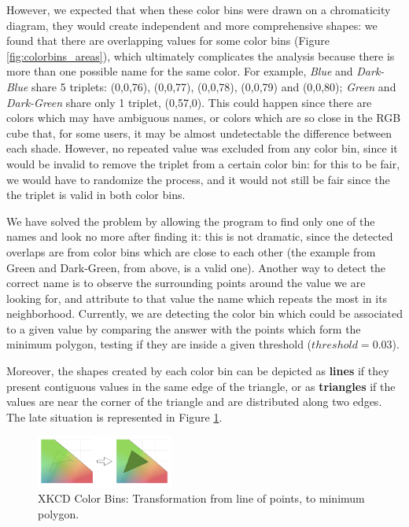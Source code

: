 %
However, we expected that when these color bins were drawn on a chromaticity diagram, they would create independent and more comprehensive shapes: we found that there are overlapping
values for some color bins (Figure \ref{fig:colorbins_areas}), which ultimately complicates the analysis because there is more than one possible name for the same color. For example, \emph{Blue} and \emph{Dark-Blue}
share 5 triplets: (0,0,76), (0,0,77), (0,0,78), (0,0,79) and (0,0,80); \emph{Green} and \emph{Dark-Green} share only 1 triplet, (0,57,0). This could happen since there are colors which may have ambiguous names, or
colors which are so close in the RGB cube that, for some users, it may be almost undetectable the difference between each shade. However, no repeated value was excluded from any color bin, since it would be invalid to
remove the triplet from a certain color bin: for this to be fair, we would have to randomize the process, and it would not still be fair since the the triplet is valid in both color bins. \par
%
We have solved the problem by allowing the program to find only one of the names and look no more after finding it: this is not dramatic, since the detected overlaps are from color bins which are close to each other
(the example from Green and Dark-Green, from above, is a valid one). Another way to detect the correct name is to observe the surrounding points around the value we are looking for, and attribute to that value the name
which repeats the most in its neighborhood. Currently, we are detecting the color bin which could be associated to a given value by comparing the answer with the points which form the
minimum polygon, testing if they are inside a given threshold ($threshold = 0.03$). \par
%
Moreover, the shapes created by each color bin can be depicted as \textbf{lines} if they present contiguous values in the same edge of the triangle, or as \textbf{triangles}
if the values are near the corner of the triangle and are distributed along two edges. The late situation is represented in Figure \ref{fig:colorbins_triangle}.
%
\begin{figure}
  \centering
  \includegraphics[width=0.4\textwidth]{images/results/colorbins_transformation.png}
  \caption[XKCD Color Survey: Color Bins Transformation]{XKCD Color Bins: Transformation from line of points, to minimum polygon.}
  \label{fig:colorbins_triangle}
\end{figure}
